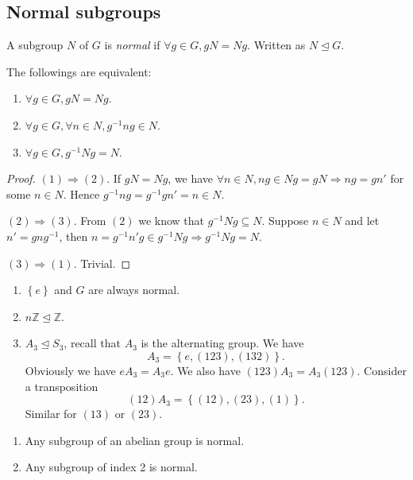 \documentclass[10pt]{article}
\begin{document}
    \subsection{Normal subgroups}
    \begin{definition}
        A subgroup $N$ of $G$ is \textit{normal} if $ \forall g\in G, gN=Ng $. Written as $ N \trianglelefteq G $.
    \end{definition}
    \begin{proposition}\label{prop:condition for normal groups}
        The followings are equivalent:
        \begin{enumerate}[(1)]
            \item $ \forall g\in G, gN=Ng $.
            \item $ \forall g\in G, \forall n\in N, g^{-1}ng\in N $.
            \item $ \forall g\in G, g^{-1}Ng=N $.
        \end{enumerate}
    \end{proposition}
    \begin{proof}
        $ (1)\Rightarrow (2) $. If $ gN=Ng $, we have $ \forall n\in N, ng\in Ng=gN \Rightarrow ng=gn' $ for some $n\in N$. Hence $ g^{-1}ng=g^{-1}gn'=n\in N $.

        $ (2) \Rightarrow (3) $. From $(2)$ we know that $ g^{-1}Ng \subseteq N $. Suppose $ n\in N $ and let $ n'=gng^{-1} $, then $ n=g^{-1}n'g\in g^{-1}Ng \Rightarrow g^{-1}Ng = N $.

        $ (3) \Rightarrow (1) $. Trivial.
    \end{proof}
    \begin{example}
        \begin{enumerate}[(1)]
            \item $ \left\{ e\right\} $ and $G$ are always normal.
            \item $ n \mathbb{Z}\trianglelefteq \mathbb{Z}$.
            \item $ A_3 \trianglelefteq S_3 $, recall that $ A_3 $ is the alternating group. We have
            \[
                A_3=\left\{ e,(123),(132)\right\}
            .\]
            Obviously we have $ eA_3=A_3e $. We also have $(123)A_3=A_3(123)$. Consider a transposition
            \[
                (12)A_3=\left\{(12),(23),(1) \right\}
            .\]
            Similar for $(13)$ or $(23)$.
        \end{enumerate}
    \end{example}
    \begin{proposition}
        \begin{enumerate}[(1)]
            \item Any subgroup of an abelian group is normal.
            \item Any subgroup of index 2 is normal.
        \end{enumerate}
    \end{proposition}
\end{document}
